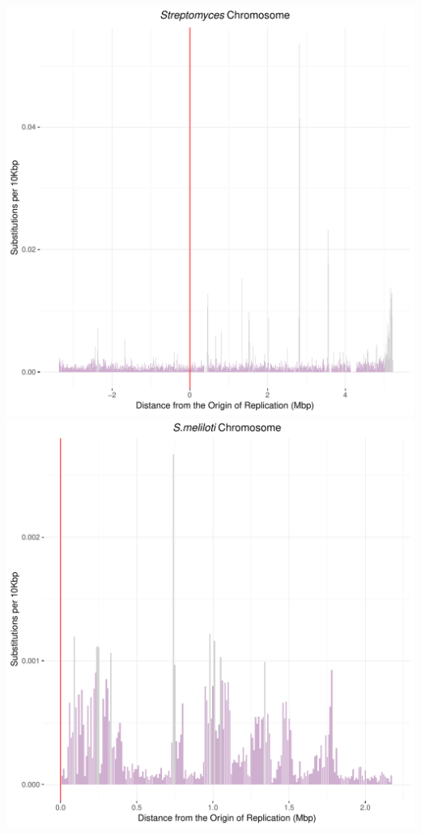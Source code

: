 \documentclass[12pt]{article}
\begin{document}
\includegraphics[width=\textwidth]{strep_weighted_subs_bidirectionality_colour_3Nov19.pdf}
\includegraphics[width=\textwidth]{sinoC_weighted_subs_bidirectionality_colour_2Nov19.pdf}
\end{document}
